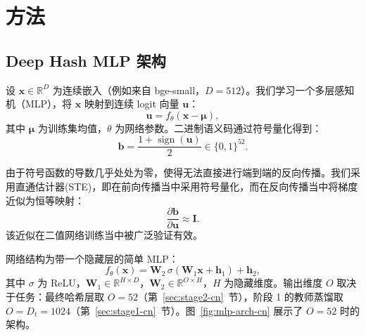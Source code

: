 \documentclass[11pt,a4paper]{article}
\DeclareMathOperator{\sign}{sign}
\begin{document}
\section{方法}

\subsection{Deep Hash MLP 架构}\label{sec:mlp-arch-cn}

设 $\mathbf{x} \in \mathbb{R}^D$ 为连续嵌入（例如来自 bge-small，$D=512$）。我们学习一个多层感知机（MLP），将 $\mathbf{x}$ 映射到连续 logit 向量 $\mathbf{u}$：
\begin{equation}
    \mathbf{u} = f_\theta(\mathbf{x} - \boldsymbol{\mu}),
\end{equation}
其中 $\boldsymbol{\mu}$ 为训练集均值，$\theta$ 为网络参数。二进制语义码通过符号量化得到：
\begin{equation}
    \mathbf{b} = \frac{1 + \sign(\mathbf{u})}{2} \in \{0, 1\}^{52}.
\end{equation}

由于符号函数的导数几乎处处为零，使得无法直接进行端到端的反向传播。我们采用直通估计器(STE)，即在前向传播当中采用符号量化，而在反向传播当中将梯度近似为恒等映射：
\begin{equation}
    \frac{\partial \mathbf{b}}{\partial \mathbf{u}} \approx \mathbf{I}.
\end{equation}
该近似在二值网络训练当中被广泛验证有效。

网络结构为带一个隐藏层的简单 MLP：
\begin{equation}
    f_\theta(\mathbf{x}) = \mathbf{W}_2 \, \sigma(\mathbf{W}_1 \mathbf{x} + \mathbf{h}_1) + \mathbf{h}_2,
\end{equation}
其中 $\sigma$ 为 ReLU，$\mathbf{W}_1 \in \mathbb{R}^{H \times D}$，$\mathbf{W}_2 \in \mathbb{R}^{O \times H}$，$H$ 为隐藏维度。输出维度 $O$ 取决于任务：最终哈希层取 $O=52$（第~\ref{sec:stage2-cn}~节），阶段 1 的教师蒸馏取 $O=D_t=1024$（第~\ref{sec:stage1-cn}~节）。图~\ref{fig:mlp-arch-cn} 展示了 $O=52$ 时的架构。
\end{document}
